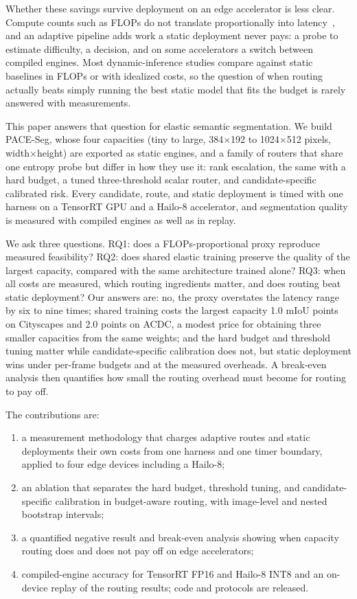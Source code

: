 \documentclass[a4paper,5p]{elsarticle}
\newcommand{\method}{PACE-Seg}
\newcommand{\miou}{mIoU}
\begin{document}
Whether these savings survive deployment on an edge accelerator is less clear. Compute counts such as FLOPs do not translate proportionally into latency~\cite{li2021hwnasbench}, and an adaptive pipeline adds work a static deployment never pays: a probe to estimate difficulty, a decision, and on some accelerators a switch between compiled engines. Most dynamic-inference studies compare against static baselines in FLOPs or with idealized costs, so the question of when routing actually beats simply running the best static model that fits the budget is rarely answered with measurements.

This paper answers that question for elastic semantic segmentation. We build \method{}, whose four capacities (tiny to large, 384$\times$192 to 1024$\times$512 pixels, width$\times$height) are exported as static engines, and a family of routers that share one entropy probe but differ in how they use it: rank escalation, the same with a hard budget, a tuned three-threshold scalar router, and candidate-specific calibrated risk. Every candidate, route, and static deployment is timed with one harness on a TensorRT GPU and a Hailo-8 accelerator, and segmentation quality is measured with compiled engines as well as in replay.

We ask three questions. RQ1: does a FLOPs-proportional proxy reproduce measured feasibility? RQ2: does shared elastic training preserve the quality of the largest capacity, compared with the same architecture trained alone? RQ3: when all costs are measured, which routing ingredients matter, and does routing beat static deployment? Our answers are: no, the proxy overstates the latency range by six to nine times; shared training costs the largest capacity 1.0 \miou{} points on Cityscapes and 2.0 points on ACDC, a modest price for obtaining three smaller capacities from the same weights; and the hard budget and threshold tuning matter while candidate-specific calibration does not, but static deployment wins under per-frame budgets and at the measured overheads. A break-even analysis then quantifies how small the routing overhead must become for routing to pay off.

The contributions are:
\begin{enumerate}
    \item a measurement methodology that charges adaptive routes and static deployments their own costs from one harness and one timer boundary, applied to four edge devices including a Hailo-8;
    \item an ablation that separates the hard budget, threshold tuning, and candidate-specific calibration in budget-aware routing, with image-level and nested bootstrap intervals;
    \item a quantified negative result and break-even analysis showing when capacity routing does and does not pay off on edge accelerators;
    \item compiled-engine accuracy for TensorRT FP16 and Hailo-8 INT8 and an on-device replay of the routing results; code and protocols are released.
\end{enumerate}
\end{document}
